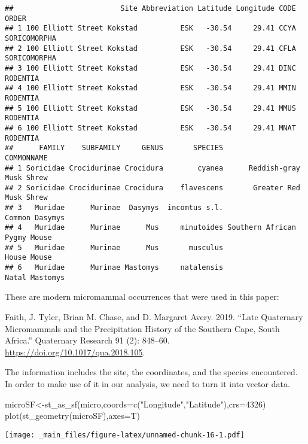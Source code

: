 \documentclass[
]{book}
\newenvironment{Shaded}{\begin{snugshade}}{\end{snugshade}}
\newcommand{\AttributeTok}[1]{\textcolor[rgb]{0.77,0.63,0.00}{#1}}
\newcommand{\DecValTok}[1]{\textcolor[rgb]{0.00,0.00,0.81}{#1}}
\newcommand{\FunctionTok}[1]{\textcolor[rgb]{0.00,0.00,0.00}{#1}}
\newcommand{\NormalTok}[1]{#1}
\newcommand{\OtherTok}[1]{\textcolor[rgb]{0.56,0.35,0.01}{#1}}
\newcommand{\StringTok}[1]{\textcolor[rgb]{0.31,0.60,0.02}{#1}}
\begin{document}
\begin{verbatim}
##                         Site Abbreviation Latitude Longitude CODE        ORDER
## 1 100 Elliott Street Kokstad          ESK   -30.54     29.41 CCYA SORICOMORPHA
## 2 100 Elliott Street Kokstad          ESK   -30.54     29.41 CFLA SORICOMORPHA
## 3 100 Elliott Street Kokstad          ESK   -30.54     29.41 DINC     RODENTIA
## 4 100 Elliott Street Kokstad          ESK   -30.54     29.41 MMIN     RODENTIA
## 5 100 Elliott Street Kokstad          ESK   -30.54     29.41 MMUS     RODENTIA
## 6 100 Elliott Street Kokstad          ESK   -30.54     29.41 MNAT     RODENTIA
##      FAMILY    SUBFAMILY     GENUS       SPECIES                   COMMONNAME
## 1 Soricidae Crocidurinae Crocidura        cyanea      Reddish-gray Musk Shrew
## 2 Soricidae Crocidurinae Crocidura    flavescens       Greater Red Musk Shrew
## 3   Muridae      Murinae  Dasymys  incomtus s.l.               Common Dasymys
## 4   Muridae      Murinae      Mus     minutoides Southern African Pygmy Mouse
## 5   Muridae      Murinae      Mus       musculus                  House Mouse
## 6   Muridae      Murinae Mastomys     natalensis               Natal Mastomys
\end{verbatim}

These are modern micromammal occurrences that were used in this paper:

Faith, J. Tyler, Brian M. Chase, and D. Margaret Avery. 2019. ``Late Quaternary Micromammals and the Precipitation History of the Southern Cape, South Africa.'' Quaternary Research 91 (2): 848--60. \url{https://doi.org/10.1017/qua.2018.105}.

The information includes the site, the coordinates, and the species encountered. In order to make use of it in our analysis, we need to turn it into vector data.

\begin{Shaded}
\begin{Highlighting}[]
\NormalTok{microSF}\OtherTok{\textless{}{-}}\FunctionTok{st\_as\_sf}\NormalTok{(micro,}\AttributeTok{coords=}\FunctionTok{c}\NormalTok{(}\StringTok{"Longitude"}\NormalTok{,}\StringTok{"Latitude"}\NormalTok{),}\AttributeTok{crs=}\DecValTok{4326}\NormalTok{)}
\FunctionTok{plot}\NormalTok{(}\FunctionTok{st\_geometry}\NormalTok{(microSF),}\AttributeTok{axes=}\NormalTok{T)}
\end{Highlighting}
\end{Shaded}

\texttt{[image: \_main\_files/figure-latex/unnamed-chunk-16-1.pdf]}
\end{document}
